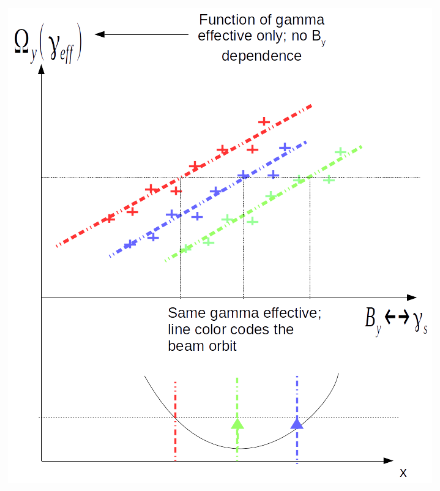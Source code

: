 \documentclass{article}
\newcommand{\Wy}{\Omega_y}
\begin{document}
	\begin{figure}[h]
		\centering
		\includegraphics[scale=.5]{img/Argument2}
	\end{figure}
	
	
	
\end{document}
